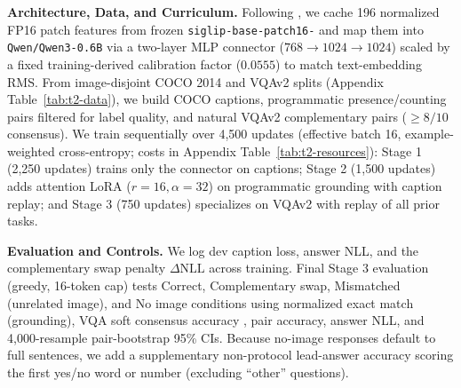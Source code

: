 \documentclass{article}
\begin{document}
\textbf{Architecture, Data, and Curriculum.} Following \citet{liu2023llava}, we cache 196 normalized FP16 patch features from frozen \texttt{siglip-\allowbreak base-\allowbreak patch16-} \citep{zhai2023siglip} and map them into \texttt{Qwen/Qwen3-0.6B} \citep{qwen3} via a two-layer MLP connector ($768\to 1024\to 1024$) scaled by a fixed training-derived calibration factor ($0.0555$) to match text-embedding RMS. From image-disjoint COCO 2014 \citep{lin2014coco, chen2015cococaptions} and VQAv2 \citep{goyal2017vqav2} splits (Appendix Table~\ref{tab:t2-data}), we build COCO captions, programmatic presence/counting pairs filtered for label quality, and natural VQAv2 complementary pairs ($\ge 8/10$ consensus). We train sequentially over 4,500 updates (effective batch 16, example-weighted cross-entropy; costs in Appendix Table~\ref{tab:t2-resources}): Stage 1 (2,250 updates) trains only the connector on captions; Stage 2 (1,500 updates) adds attention LoRA ($r=16, \alpha=32$) \citep{hu2022lora} on programmatic grounding with caption replay; and Stage 3 (750 updates) specializes on VQAv2 with replay of all prior tasks.

\textbf{Evaluation and Controls.} We log dev caption loss, answer NLL, and the complementary swap penalty $\Delta\text{NLL}$ across training. Final Stage 3 evaluation (greedy, 16-token cap) tests Correct, Complementary swap, Mismatched (unrelated image), and No image conditions using normalized exact match (grounding), VQA soft consensus accuracy \citep{vqa_eval_code}, pair accuracy, answer NLL, and 4,000-resample pair-bootstrap 95\% CIs. Because no-image responses default to full sentences, we add a supplementary non-protocol lead-answer accuracy scoring the first yes/no word or number (excluding ``other'' questions).
\end{document}
